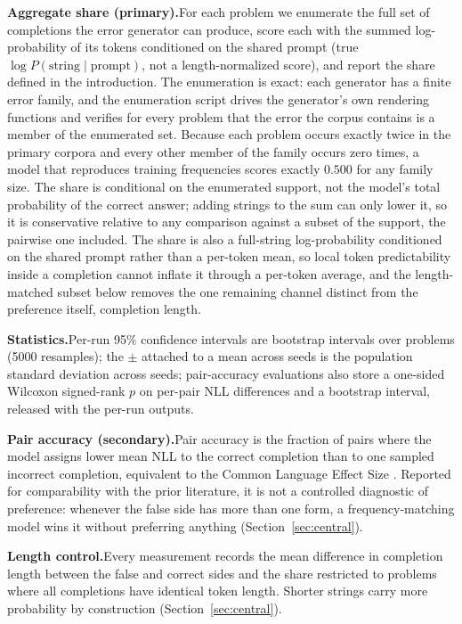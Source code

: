 \documentclass{article}
\begin{document}
\textbf{Aggregate share (primary).}\quad For each problem we enumerate the full set of completions the error generator can produce, score each with the summed log-probability of its tokens conditioned on the shared prompt (true $\log P(\text{string} \mid \text{prompt})$, not a length-normalized score), and report the share defined in the introduction. The enumeration is exact: each generator has a finite error family, and the enumeration script drives the generator's own rendering functions and verifies for every problem that the error the corpus contains is a member of the enumerated set. Because each problem occurs exactly twice in the primary corpora and every other member of the family occurs zero times, a model that reproduces training frequencies scores exactly $0.500$ for any family size. The share is conditional on the enumerated support, not the model's total probability of the correct answer; adding strings to the sum can only lower it, so it is conservative relative to any comparison against a subset of the support, the pairwise one included. The share is also a full-string log-probability conditioned on the shared prompt rather than a per-token mean, so local token predictability inside a completion cannot inflate it through a per-token average, and the length-matched subset below removes the one remaining channel distinct from the preference itself, completion length.

\textbf{Statistics.}\quad Per-run 95\% confidence intervals are bootstrap intervals over problems (5000 resamples); the $\pm$ attached to a mean across seeds is the population standard deviation across seeds; pair-accuracy evaluations also store a one-sided Wilcoxon signed-rank $p$ on per-pair NLL differences and a bootstrap interval, released with the per-run outputs.

\textbf{Pair accuracy (secondary).}\quad Pair accuracy is the fraction of pairs where the model assigns lower mean NLL to the correct completion than to one sampled incorrect completion, equivalent to the Common Language Effect Size \citep{mcgraw1992common}. Reported for comparability with the prior literature, it is not a controlled diagnostic of preference: whenever the false side has more than one form, a frequency-matching model wins it without preferring anything (Section~\ref{sec:central}).

\textbf{Length control.}\quad Every measurement records the mean difference in completion length between the false and correct sides and the share restricted to problems where all completions have identical token length. Shorter strings carry more probability by construction (Section~\ref{sec:central}).
\end{document}

